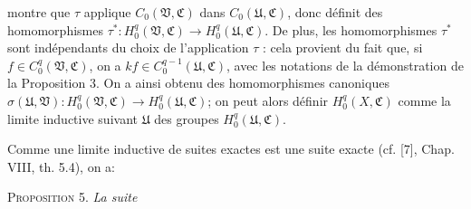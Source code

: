 montre que $\tau$ applique $C_0(\mathfrak{V}, \mathfrak{C})$ dans $C_0(\mathfrak{U}, \mathfrak{C})$, donc définit des homomorphismes $\tau^* : H_0^q(\mathfrak{V}, \mathfrak{C}) \to H_0^q(\mathfrak{U}, \mathfrak{C})$. De plus, les homomorphismes $\tau^*$ sont indépendants du choix de l'application $\tau$ : cela provient du fait que, si $f \in C_0^q(\mathfrak{V}, \mathfrak{C})$, on a $kf \in C_0^{q-1}(\mathfrak{U}, \mathfrak{C})$, avec les notations de la démonstration de la Proposition 3. On a ainsi obtenu des homomorphismes canoniques $\sigma(\mathfrak{U}, \mathfrak{V}) : H_0^q(\mathfrak{V}, \mathfrak{C}) \to H_0^q(\mathfrak{U}, \mathfrak{C})$; on peut alors définir $H_0^q(X, \mathfrak{C})$ comme la limite inductive suivant $\mathfrak{U}$ des groupes $H_0^q(\mathfrak{U}, \mathfrak{C})$.



%
%
%
Comme une limite inductive de suites exactes est une suite exacte (cf. [7], Chap. VIII, th. 5.4), on a:

\textsc{Proposition} 5. \textit{La suite}


